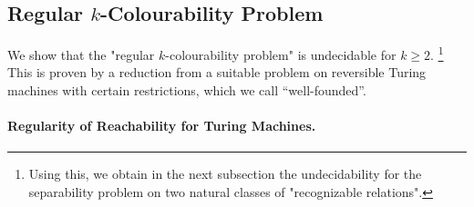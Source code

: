 \subsection{Regular $k$-Colourability Problem}
\label{sec:dichotomy-k-regular-colourability}

We show that the "regular $k$-colourability problem" is undecidable for $k\geq 2$.%
\footnote{
    Using this, we obtain in the next subsection 
    the undecidability for the separability problem on two natural classes of 
    "recognizable relations".
}
This is proven by a reduction from a suitable problem on reversible 
Turing machines with certain restrictions, which we call ``well-founded''.

\paragraph*{Regularity of Reachability for Turing Machines.}

